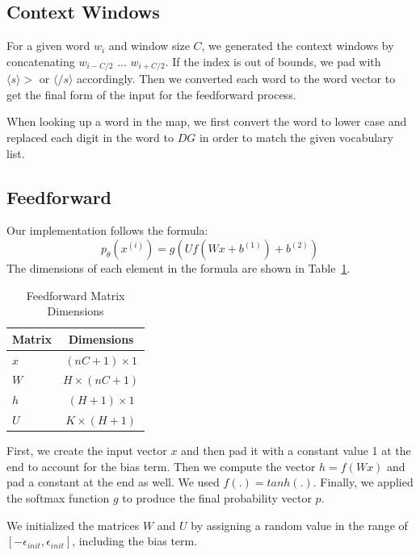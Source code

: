 \documentclass[12pt, twocolumn]{article}
\begin{document}
\subsection{Context Windows}
For a given word $w_i$ and window size $C$, we generated the context windows by concatenating $w_{i-C/2}$ ... $w_{i+C/2}$. If the index is out of bounds, we pad with $\langle s\rangle>$ or $\langle/s\rangle$ accordingly. Then we converted each word to the word vector to get the final form of the input for the feedforward process.

When looking up a word in the map, we first convert the word to lower case and replaced each digit in the word to $DG$ in order to match the given vocabulary list.
\subsection{Feedforward}
Our implementation follows the formula:
\begin{equation*}
p_\theta(x^{(i)})=g(Uf(Wx+b^{(1)})+b^{(2)})
\end{equation*}
The dimensions of each element in the formula are shown in Table~\ref{tab:dim}.
\begin{table}[H]
\centering
	\begin{tabular}{|l|c|}
		\hline
		Matrix & Dimensions \\\hline
		$x$ & ${(nC+1)}\times{1}$ \\\hline
		$W$ & ${H}\times{(nC+1)}$ \\\hline
		$h$ & ${(H+1)}\times{1}$ \\\hline
		$U$ & ${K}\times{(H+1)}$ \\\hline
	\end{tabular}
\caption{Feedforward Matrix Dimensions}
\label{tab:dim}
\end{table}
First, we create the input vector $x$ and then pad it with a constant value 1 at the end to account for the bias term. Then we compute the vector $h=f(Wx)$ and pad a constant at the end as well. We used $f(.) = tanh(.)$. Finally, we applied the softmax function $g$ to produce the final probability vector $p$.

We initialized the matrices $W$ and $U$ by assigning a random value in the range of $[-\epsilon_{init}, \epsilon_{init}]$, including the bias term.
\end{document}
